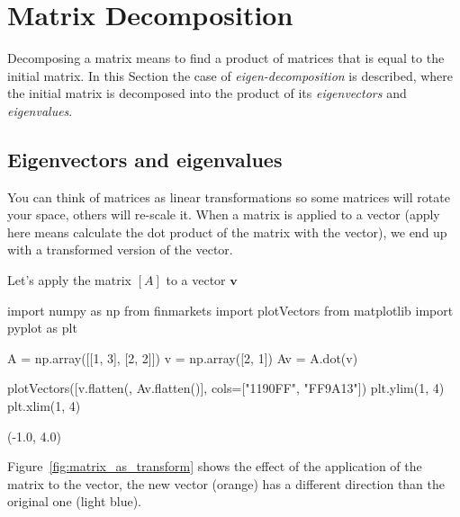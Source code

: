 \section{Matrix Decomposition}
\label{eigendecomposition}

Decomposing a matrix means to find a product of matrices that is equal to the initial matrix. In this Section the case of \emph{eigen-decomposition} is described, where the initial matrix is decomposed into the product of its \emph{eigenvectors} and \emph{eigenvalues}.

\subsection{Eigenvectors and eigenvalues}
\label{eigenvectors-and-eigenvalues}

You can think of matrices as linear transformations so some matrices will rotate your space, others will re-scale it. When a matrix is applied to a vector (apply here means calculate the dot product of the matrix with the vector), we end up with a transformed version of the vector.

Let's apply the matrix \([A]\) to a vector $\boldsymbol{v}$

\begin{ipython}
import numpy as np
from finmarkets import plotVectors
from matplotlib import pyplot as plt

A = np.array([[1, 3], [2, 2]])	
v = np.array([2, 1])
Av = A.dot(v)

plotVectors([v.flatten({}, Av.flatten()], cols=["1190FF", "FF9A13"])
plt.ylim(1, 4)
plt.xlim(1, 4)
\end{ipython}
\begin{ioutput}
(-1.0, 4.0)
\end{ioutput}

Figure~\ref{fig:matrix_as_transform} shows the effect of the application of the matrix to the vector, the new vector (orange) has a different direction than the original one (light blue).

